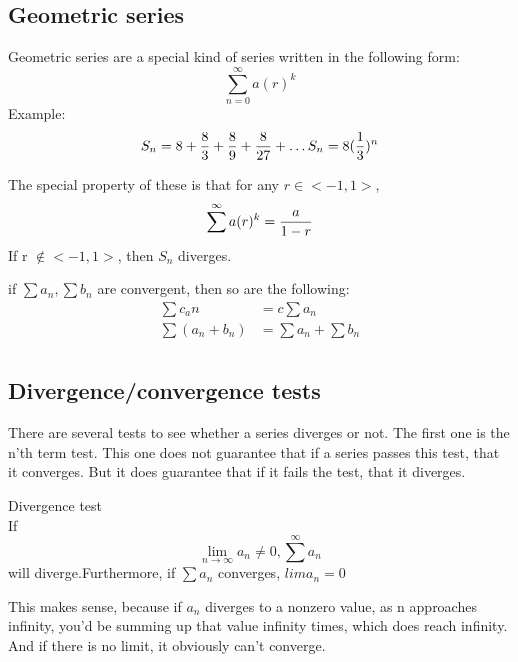 \documentclass[17pt]{extarticle} %
\begin{document}
\subsection{Geometric series}
Geometric series are a special kind of series written in the following form:
$$
\sum^\infty_{n=0} a(r)^k
$$
Example: 
$$
S_n = 8 + {8 \over 3} + {8 \over 9} + {8 \over 27} + \ldots \\
S_n = 8 ({1\over 3})^n
$$

The special property of these is that for any $r \in <-1, 1>$, 
$$
\sum^\infty a(r)^k = {a \over 1 - r}
$$
If r $\not\in <-1, 1>$, then $S_n$ diverges.

\begin{theorem*}   
    if $\sum a_n, \sum b_n$ are convergent, then so are the following:
    $$
    \begin{aligned}
        \sum c_an &= c \sum a_n \\
        \sum \left( a_n + b_n \right) &= \sum a_n + \sum b_n \\
    \end{aligned}
    $$
\end{theorem*} 

\subsection{Divergence/convergence tests}
There are several tests to see whether a series diverges or not. 
The first one is the n'th term test. This one does not guarantee that if a series passes this test, that it converges.
But it does guarantee that if it fails the test, that it diverges.

\begin{theorem*}{Divergence test} \\
    If
    $$
    \lim_{n \to \infty} a_n \neq 0, 
     \sum^\infty a_n 
    $$ 
    will diverge.Furthermore, if $\sum a_n$ converges, $lim a_n = 0$
\end{theorem*}
This makes sense, because if $a_n$ diverges to a nonzero value, as n approaches infinity, you'd be summing up that value infinity times, 
which does reach infinity. And if there is no limit, it obviously can't converge.
\end{document}
